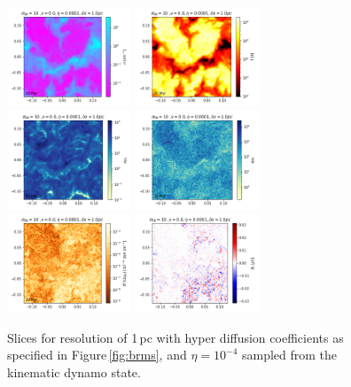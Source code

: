 \documentclass[preprint2]{aastex63}
\begin{document}
\begin{figure}
\centering
\includegraphics[trim=0.0cm 0.00cm 0.0cm 0.0cm,clip=true,width=0.33\textwidth]{csc_figs/rho1pcPm0e-4_00.png}
\includegraphics[trim=0.0cm 0.00cm 0.0cm 0.0cm,clip=true,width=0.33\textwidth]{csc_figs/tt1pcPm0e-4_00.png}
\includegraphics[trim=0.0cm 0.00cm 0.0cm 0.0cm,clip=true,width=0.33\textwidth]{csc_figs/Pm1pcPm0e-4_00.png}
\includegraphics[trim=0.0cm 0.00cm 0.0cm 0.0cm,clip=true,width=0.33\textwidth]{csc_figs/Rm1pcPm0e-4_00.png}
\includegraphics[trim=0.0cm 0.00cm 0.0cm 0.0cm,clip=true,width=0.33\textwidth]{csc_figs/pb1pcPm0e-4_00.png}
\includegraphics[trim=0.0cm 0.00cm 0.0cm 0.0cm,clip=true,width=0.33\textwidth]{csc_figs/bb11pcPm0e-4_00.png}
\caption{
Slices for resolution of 1\,pc with hyper diffusion coefficients as 
specified in Figure\,\ref{fig:brms}, and $\eta=10^{-4}$ sampled from the 
kinematic dynamo state.
\label{fig:1pcUB}
}
\end{figure}
\end{document}
